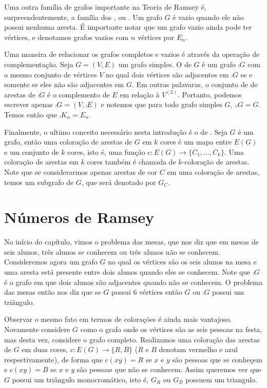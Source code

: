 Uma outra família de grafos importante na Teoria de Ramsey é, surpreendentemente, a família dos , ou . Um grafo $G$ é vazio quando ele não possui nenhuma aresta. É importante notar que um grafo vazio ainda pode ter vértices, e denotamos grafos vazios com $n$ vértices por $E_n$.

Uma maneira de relacionar os grafos completos e vazios é através da operação de complementação. Seja $G = (V,E)$ um grafo simples. O  de $G$ é um grafo $\comp{G}$ com o mesmo conjunto de vértices $V$ no qual dois vértices são adjacentes em $\comp{G}$ se e somente se eles não são adjacentes em $G$. Em outras palavaras, o conjunto de de arestas de $\comp{G}$ é o complemento de $E$ em relação à $V^{(2)}$. Portanto, podemos escrever apenas $\comp{G} = (V,\comp{E})$ e notemos que para todo grafo simples $G$, $\comp{\comp{G}} = G$. Temos então que $\comp{K_n} = E_n$.


Finalmente, o ultimo conceito necessário nesta introdução é o de . Seja $G$ é um grafo, então uma coloração de arestas de $G$ em $k$ cores é um mapa entre $E(G)$ e um conjunto de $k$ cores, isto é, uma função $c: E(G) \to \{ C_1, \dots, C_k\}$. Uma coloração de arestas em $k$ cores também é chamada de $k$-coloração de arestas. Note que se considerarmos apenas arestas de cor $C$ em uma coloração de arestas, temos um subgrafo de $G$, que será denotado por $G_C$.



\section{Números de Ramsey}

No início do capítulo, vimos o problema das mesas, que nos diz que em mesas de seis alunos, três alunos se conhecem ou três alunos não se conhecem. Consideremos agora um grafo $G$ no qual os vértices são os seis alunos na mesa e uma aresta está presente entre dois alunos quando eles se conhecem. Note que $\comp{G}$ é o grafo em que dois alunos são adjacentes quando não se conhecem. O problema das mesas então nos diz que se $G$ possui 6 vértices então $G$ ou $\comp{G}$ possui um triângulo.

Observar o mesmo fato em termos de colorações é ainda mais vantajoso. Novamente considere $G$ como o grafo onde os vértices são as seis pessoas na festa, mas desta vez, considere o grafo completo. Realizamos uma coloração das arestas de $G$ em duas cores, $c: E(G) \to \{ R,B \}$ ($R$ e $B$ denotam vermelho e azul respectivamente), de forma que $c(xy) = R$ se $x$ e $y$ são pessoas que se conheçem e $c(xy) = B$ se $x$ e $y$ são pessoas que não se conhecem. Assim queremos ver que $G$ possui um triângulo monocromático, isto é, $G_R$ ou $G_B$ possuem um triangulo.


